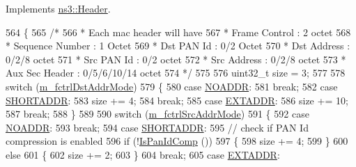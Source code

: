 Implements \hyperlink{classns3_1_1Header_a6ef0497eabc1b1fb0ad42738eb73f934}{ns3\+::\+Header}.


\begin{DoxyCode}
564 \{
565   \textcolor{comment}{/*}
566 \textcolor{comment}{   * Each mac header will have}
567 \textcolor{comment}{   * Frame Control      : 2 octet}
568 \textcolor{comment}{   * Sequence Number    : 1 Octet}
569 \textcolor{comment}{   * Dst PAN Id         : 0/2 Octet}
570 \textcolor{comment}{   * Dst Address        : 0/2/8 octet}
571 \textcolor{comment}{   * Src PAN Id         : 0/2 octet}
572 \textcolor{comment}{   * Src Address        : 0/2/8 octet}
573 \textcolor{comment}{   * Aux Sec Header     : 0/5/6/10/14 octet}
574 \textcolor{comment}{   */}
575 
576   uint32\_t size = 3;
577 
578   \textcolor{keywordflow}{switch} (\hyperlink{classns3_1_1LrWpanMacHeader_a02618462ab859dbb5cacffb93c73a209}{m\_fctrlDstAddrMode})
579     \{
580     \textcolor{keywordflow}{case} \hyperlink{classns3_1_1LrWpanMacHeader_a98e60673830540d040ee9db3a93096bda4e7971609a9fb4adf567f7cc6c87798e}{NOADDR}:
581       \textcolor{keywordflow}{break};
582     \textcolor{keywordflow}{case} \hyperlink{classns3_1_1LrWpanMacHeader_a98e60673830540d040ee9db3a93096bda62b2ffee1b7c2b3b6205cbfbd34c2072}{SHORTADDR}:
583       size += 4;
584       \textcolor{keywordflow}{break};
585     \textcolor{keywordflow}{case} \hyperlink{classns3_1_1LrWpanMacHeader_a98e60673830540d040ee9db3a93096bda9d278e36bffa9063b5c24b6ed6aa0262}{EXTADDR}:
586       size += 10;
587       \textcolor{keywordflow}{break};
588     \}
589 
590   \textcolor{keywordflow}{switch} (\hyperlink{classns3_1_1LrWpanMacHeader_a73a10a3c6b5bacfd52fcde03bb62bba5}{m\_fctrlSrcAddrMode})
591     \{
592     \textcolor{keywordflow}{case} \hyperlink{classns3_1_1LrWpanMacHeader_a98e60673830540d040ee9db3a93096bda4e7971609a9fb4adf567f7cc6c87798e}{NOADDR}:
593       \textcolor{keywordflow}{break};
594     \textcolor{keywordflow}{case} \hyperlink{classns3_1_1LrWpanMacHeader_a98e60673830540d040ee9db3a93096bda62b2ffee1b7c2b3b6205cbfbd34c2072}{SHORTADDR}:
595       \textcolor{comment}{// check if PAN Id compression is enabled}
596       \textcolor{keywordflow}{if} (!\hyperlink{classns3_1_1LrWpanMacHeader_a0d35dae49361fa89aa07a5675d26fc4e}{IsPanIdComp} ())
597         \{
598           size += 4;
599         \}
600       \textcolor{keywordflow}{else}
601         \{
602           size += 2;
603         \}
604       \textcolor{keywordflow}{break};
605     \textcolor{keywordflow}{case} \hyperlink{classns3_1_1LrWpanMacHeader_a98e60673830540d040ee9db3a93096bda9d278e36bffa9063b5c24b6ed6aa0262}{EXTADDR}:

\end{DoxyCode}
